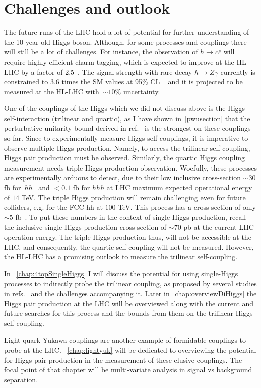 \section{Challenges and outlook \label{sec:Higgscouplchallenge} }
\par The future runs of the LHC  hold a lot of potential for further understanding of the 10-year old Higgs boson.  Although, for some processes and couplings there will still be a lot of challenges. For instance, the observation of $h \to c \bar{c}$ will require highly efficient charm-tagging, which is expected to improve at the HL-LHC by a factor of 2.5~\cite{ATL-PHYS-PUB-2018-016}.  The signal strength with rare decay $ h \to Z \gamma$ currently is constrained to $3.6$ times the SM values at 95\% CL ~\cite{ATLAS:2020qcv} and it is projected to be measured at the HL-LHC with~$\sim 10\%$ uncertainty. 
\par One of the couplings of the Higgs which we did not discuss above is the Higgs self-interaction (trilinear and quartic), as I have shown in~\autoref{pwusection} that the perturbative unitarity bound derived in ref.~\cite{DiLuzio:2017tfn} is the strongest on these couplings so far.  Since to experimentally measure Higgs self-couplings, it is imperative to observe multiple Higgs production. Namely, to access the trilinear self-coupling, Higgs pair production must be observed. Similarly, the quartic Higgs coupling measurement needs triple Higgs production observation. Woefully, these processes are experimentally arduous to detect, due to their low inclusive cross-section $\sim 30$ fb for~$hh$~\cite{Dawson:1998py} and $<0.1$ fb for $hhh$ at LHC maximum expected operational energy of $14$ TeV. The triple Higgs production will remain challenging even for future colliders, e.g. for the FCC-hh at $100$ TeV. This process has a cross-section of only $\sim 5$ fb~\cite{Papaefstathiou:2015paa}.  To put these numbers in the context of single Higgs production, recall the inclusive single-Higgs production cross-section of $\sim 70$ pb at the current LHC operation energy.  The triple Higgs production thus, will not be accessible at the LHC, and consequently, the quartic self-coupling will not be measured. However, the HL-LHC has a promising outlook to measure the trilinear self-coupling.
\par In ~\autoref{chap:4topSingleHiggs} I will discuss the potential for using single-Higgs processes to indirectly probe the trilinear coupling, as proposed by several studies in refs.~ \cite{McCullough:2013rea, Gorbahn:2016uoy, Degrassi:2016wml, Bizon:2016wgr, Maltoni:2017ims, Degrassi:2019yix, Degrassi:2021uik, Haisch:2021hvy} and the challenges accompanying it. Later in~\autoref{chap:overviewDiHiggs} the Higgs pair production at the LHC will be overviewed along with the current and future searches for this process and the bounds from them on the trilinear Higgs self-coupling. 
\par Light quark Yukawa couplings are another example of formidable couplings to probe at the LHC. ~\autoref{chap:lightyuk} will be dedicated to overviewing the potential for Higgs pair production in the measurement of these elusive couplings. The focal point of that chapter will be multi-variate analysis in signal vs background separation.
